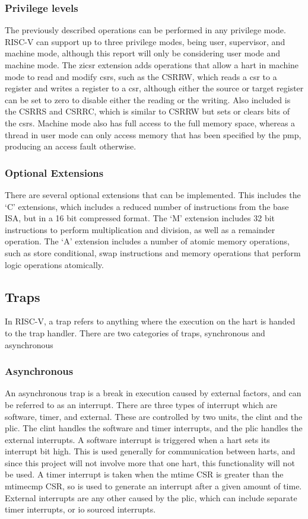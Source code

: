 \subsubsection{Privilege levels}
The previously described operations can be performed in any privilege mode. RISC-V can support up to three privilege modes, being user, supervisor, and machine mode, although this report will only be considering user mode and machine mode. The zicsr extension adds operations that allow a hart in machine mode to read and modify \ac{csrs}, such as the CSRRW, which reads a csr to a register and writes a register to a csr, although either the source or target register can be set to zero to disable either the reading or the writing. Also included is the CSRRS and CSRRC, which is similar to CSRRW but sets or clears bits of the \ac{csrs}. Machine mode also has full access to the full memory space, whereas a thread in user mode can only access memory that has been specified by the \ac{pmp}, producing an access fault otherwise.\cite{riscv_unpriv}\cite{riscv_priv}
\subsubsection{Optional Extensions}
There are several optional extensions that can be implemented. This includes the `C' extensions, which includes a reduced number of instructions from the base ISA, but in a 16 bit compressed format. The `M' extension includes 32 bit instructions to perform multiplication and division, as well as a remainder operation. The `A' extension includes a number of atomic memory operations, such as store conditional, swap instructions and memory operations that perform logic operations atomically.
\subsection{Traps}
In RISC-V, a trap refers to anything where the execution on the hart is handed to the trap handler. There are two categories of traps, synchronous and asynchronous
\subsubsection{Asynchronous}
An asynchronous trap is a break in execution caused by external factors, and can be referred to as an interrupt. There are three types of interrupt which are software, timer, and external. These are controlled by two units, the \ac{clint} and the \ac{plic}. The \ac{clint} handles the software and timer interrupts, and the \ac{plic} handles the external interrupts. A software interrupt is triggered when a hart sets its interrupt bit high. This is used generally for communication between harts, and since this project will not involve more that one hart, this functionality will not be used. A timer interrupt is taken when the mtime CSR is greater than the mtimecmp CSR, so is used to generate an interrupt after a given amount of time. External interrupts are any other caused by the \ac{plic}, which can include separate timer interrupts, or \ac{io} sourced interrupts.\cite{sifive_manual}
